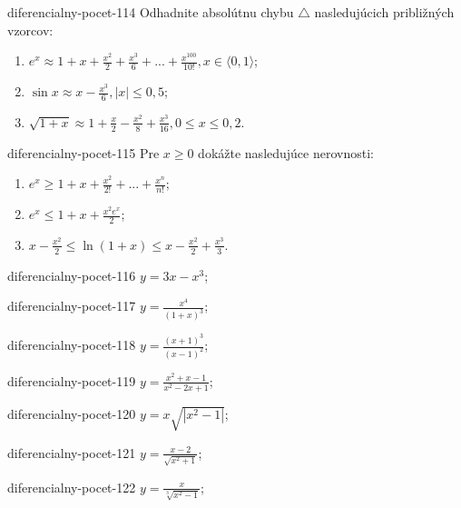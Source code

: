 \begin{defproblem}{diferencialny-pocet-114}
Odhadnite absolútnu chybu $\bigtriangleup$ nasledujúcich približných vzorcov:
\begin{enumerate}
\item $e^x\approx 1+x+\frac{x^2}{2}+\frac{x^3}{6}+...+\frac{x^{100}}{10!},x\in \langle 0,1 \rangle$;
\item $\sin x\approx x-\frac{x^3}{6},|x|\leq 0,5$;
\item $\sqrt{1+x}\approx 1+\frac{x}{2}-\frac{x^2}{8}+\frac{x^3}{16},0\leq x\leq 0,2$.
\end{enumerate}
\end{defproblem}

\begin{defproblem}{diferencialny-pocet-115}
Pre $x\geq 0$ dokážte nasledujúce nerovnosti:
\begin{enumerate}
\item $e^x\geq 1+x+\frac{x^2}{2!}+...+\frac{x^n}{n!}$;
\item $e^x\leq 1+x+\frac{x^2e^x}{2}$;
\item $x-\frac{x^2}{2}\leq \ln (1+x)\leq x-\frac{x^2}{2}+\frac{x^3}{3}$.
\end{enumerate}
\end{defproblem}

\begin{defproblem}{diferencialny-pocet-116}
$y=3x-x^3$;
\end{defproblem}

\begin{defproblem}{diferencialny-pocet-117}
$y=\frac{x^4}{(1+x)^3}$;
\end{defproblem}

\begin{defproblem}{diferencialny-pocet-118}
$y=\frac{(x+1)^3}{(x-1)^2}$;
\end{defproblem}

\begin{defproblem}{diferencialny-pocet-119}
$y=\frac{x^2+x-1}{x^2-2x+1}$;
\end{defproblem}

\begin{defproblem}{diferencialny-pocet-120}
$y=x\sqrt{|x^2-1|}$;
\end{defproblem}

\begin{defproblem}{diferencialny-pocet-121}
$y=\frac{x-2}{\sqrt{x^2+1}}$;
\end{defproblem}

\begin{defproblem}{diferencialny-pocet-122}
$y=\frac{x}{\sqrt[3]{x^2-1}}$;
\end{defproblem}

